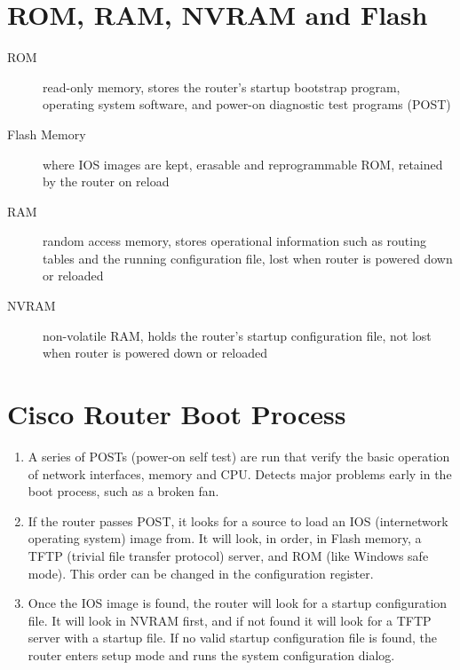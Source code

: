 \documentclass{article}
\begin{document}
\section{ROM, RAM, NVRAM and Flash}

\begin{description}

\item[ROM]
read-only memory, stores the router's startup bootstrap program, operating
system software, and power-on diagnostic test programs (POST)

\item[Flash Memory]
where IOS images are kept, erasable and reprogrammable ROM, retained by the
router on reload

\item[RAM]
random access memory, stores operational information such as routing tables
and the running configuration file, lost when router is powered down or
reloaded

\item[NVRAM]
non-volatile RAM, holds the router's startup configuration file, not lost
when router is powered down or reloaded
\end{description}

\section{Cisco Router Boot Process}

\begin{enumerate}

\item A series of POSTs (power-on self test) are run that verify the basic
operation of network interfaces, memory and CPU. Detects major problems early
in the boot process, such as a broken fan.

\item If the router passes POST, it looks for a source to load an IOS
(internetwork operating system) image from. It will look, in order, in
Flash memory, a TFTP (trivial file transfer protocol) server, and ROM (like
Windows safe mode). This order can be changed in the configuration register.

\item Once the IOS image is found, the router will look for a startup
configuration file. It will look in NVRAM first, and if not found it will
look for a TFTP server with a startup file. If no valid startup
configuration file is found, the router enters setup mode and runs the
system configuration dialog.

\end{enumerate}
\end{document}
